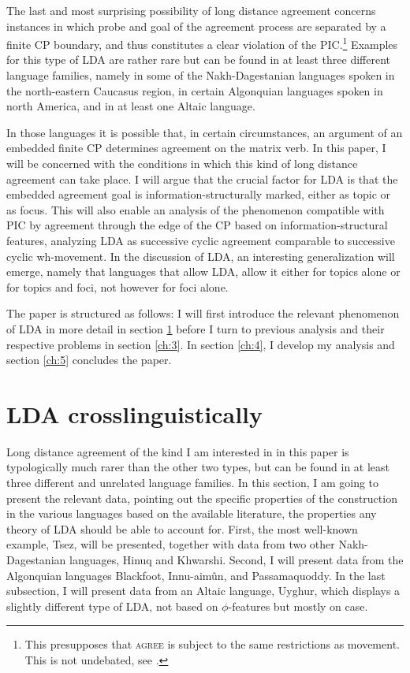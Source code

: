 \documentclass[output=paper
,modfonts
,nonflat]{langsci/langscibook}
\begin{document}
The last and most surprising possibility of long distance agreement concerns instances in which probe and goal of the agreement process are separated by a finite CP boundary, and thus constitutes a clear violation of the PIC.\footnote{This presupposes that \textsc{agree} is subject to the same restrictions as movement. This is not undebated, see \citet{Boskovic2003,Boskovic2007}.} Examples for this type of LDA are rather rare but can be found in at least three different language families, namely in some of the Nakh-Dagestanian languages spoken in the north-eastern Caucasus region, in certain Algonquian languages spoken in north America, and in at least one Altaic language.

In those languages it is possible that, in certain circumstances, an argument of an embedded finite CP determines agreement on the matrix verb. In this paper, I will be concerned with the conditions in which this kind of long distance agreement can take place. I will argue that the crucial factor for LDA is that the embedded agreement goal is information-structurally marked, either as topic or as focus. This will also enable an analysis of the phenomenon compatible with PIC by agreement through the edge of the CP based on information-structural features, analyzing LDA as successive cyclic agreement comparable to successive cyclic wh-movement. In the discussion of LDA, an interesting generalization will emerge, namely that languages that allow LDA, allow it either for topics alone or for topics and foci, not however for foci alone.

\noindent The paper is structured as follows: I will first introduce the relevant phenomenon of LDA in more detail in section \ref{ch:2} before I turn to previous analysis and their respective problems in section \ref{ch:3}. In section \ref{ch:4}, I develop my analysis and section \ref{ch:5} concludes the paper.

\section{LDA crosslinguistically}
\label{ch:2}

Long distance agreement of the kind I am interested in in this paper is typologically much rarer than the other two types, but can be found in at least three different and unrelated language families. In this section, I am going to present the relevant data, pointing out the specific properties of the construction in the various languages based on the available literature, the properties any theory of LDA should be able to account for. First, the most well-known example, Tsez, will be presented, together with data from two other Nakh-Dagestanian languages, Hinuq and Khwarshi. Second, I will present data from the Algonquian languages Blackfoot, Innu-aim\^{u}n, and Passamaquoddy. In the last subsection, I will present data from an Altaic language, Uyghur, which displays a slightly different type of LDA, not based on $ \phi $-features but mostly on case.
\end{document}
